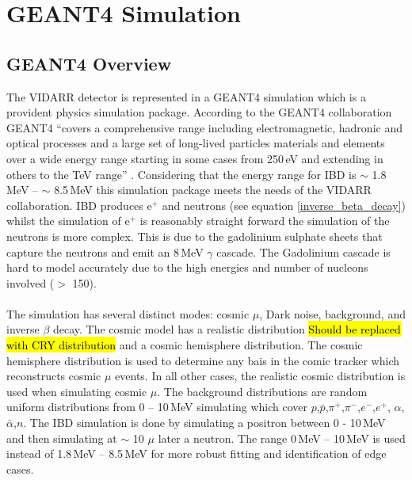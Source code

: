 

\chapter{GEANT4 Simulation}\label{chp:GEANT4Simulation}
\ifpdf
    \graphicspath{{Chapter4/Figs/Raster/}{Chapter4/Figs/PDF/}{Chapter4/Figs/}}
\else
    \graphicspath{{Chapter4/Figs/Vector/}{Chapter4/Figs/}}
\fi

\section{GEANT4 Overview}\label{sec:GEANT4Simulation_g4Overview}
The VIDARR detector is represented in a GEANT4 simulation which is a provident physics simulation package. According to the GEANT4 collaboration GEANT4 ``covers a comprehensive range including electromagnetic, hadronic and optical processes and a large set of long-lived particles materials and elements over a wide energy range starting in some cases from 250\,eV and extending in others to the TeV range'' \cite{Agostinelli:2002hh}. Considering that the energy range for IBD is $\sim$ 1.8\,MeV -- $\sim$ 8.5\,MeV \cite{Mueller_2011} this simulation package meets the needs of the VIDARR collaboration. IBD produces e$^+$ and neutrons (see equation \ref{inverse_beta_decay}) whilst the simulation of e$^+$ is reasonably straight forward the simulation of the neutrons is more complex. This is due to the gadolinium sulphate sheets that capture the neutrons and emit an 8\,MeV $\gamma$ cascade. The Gadolinium cascade is hard to model accurately due to the high energies and number of nucleons involved ($>$ 150).
\\\\The simulation has several distinct modes: cosmic $\mu$, Dark noise, background, and inverse $\beta$ decay. The cosmic model has a realistic distribution \hl{Should be replaced with CRY distribution} and a cosmic hemisphere distribution. The cosmic hemisphere distribution is used to determine any bais in the comic tracker which reconstructs cosmic $\mu$ events. In all other cases, the realistic cosmic distribution is used when simulating cosmic $\mu$. The background distributions are random uniform distributions from 0 -- 10\,MeV simulating which cover $p$,$\bar{p}$,$\pi^+$,$\pi^-$,$e^-$,$e^+$, $\alpha$,$\bar{\alpha}$,$n$. The IBD simulation is done by simulating a positron between 0 - 10\,MeV and then simulating at $\sim$ 10 $\mu$ later a neutron. The range 0\,MeV -- 10\,MeV is used instead of 1.8\,MeV -- 8.5\,MeV for more robust fitting and identification of edge cases.
